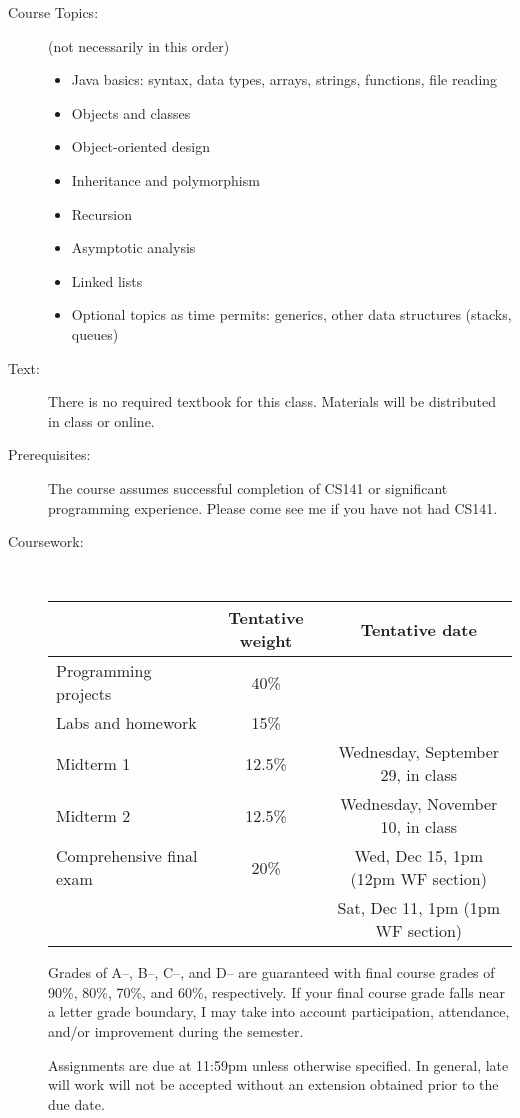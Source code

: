\documentclass [letterpaper,11pt]{article}
\begin{document}
\begin{description}
\item[Course Topics:] (not necessarily in this order) 
\begin{itemize} \setlength{\itemsep}{0em}\setlength{\parskip}{0pt}
	\item Java basics: syntax, data types, arrays, strings, functions, file reading
	\item Objects and classes
	\item Object-oriented design
	\item Inheritance and polymorphism
	\item Recursion
	\item Asymptotic analysis
	\item Linked lists
	\item Optional topics as time permits: generics, other data structures (stacks, queues)
	\end{itemize}



\item[Text:]
   There is no required textbook for this class.  Materials will be distributed in class
   or online.  

\item[Prerequisites:]
The course assumes successful completion of CS141 or significant programming experience.  Please come see me if you have not had CS141.

\item[Coursework:] \

\begin{tabular}{lcc} 
& Tentative weight & Tentative date \\ \hline
Programming projects & 40\% & \\
Labs and homework & 15\% & \\
Midterm 1 & 12.5\% & Wednesday, September 29, in class \\
Midterm 2 & 12.5\% & Wednesday, November 10, in class\\
Comprehensive final exam & 20\% & Wed, Dec 15, 1pm (12pm WF section)\\
 && Sat, Dec 11, 1pm (1pm WF section)
\end{tabular}

Grades of A--, B--, C--, and D-- are guaranteed with final course grades of 90\%, 80\%,
70\%, and 60\%, respectively.  If your final course grade falls near a letter grade boundary,
I may take into account participation, attendance, and/or improvement during the semester.

Assignments are due at 11:59pm unless otherwise specified.  In general, late will work
will not be accepted without an extension obtained prior to the due date.


\end{description}
\end{document}
